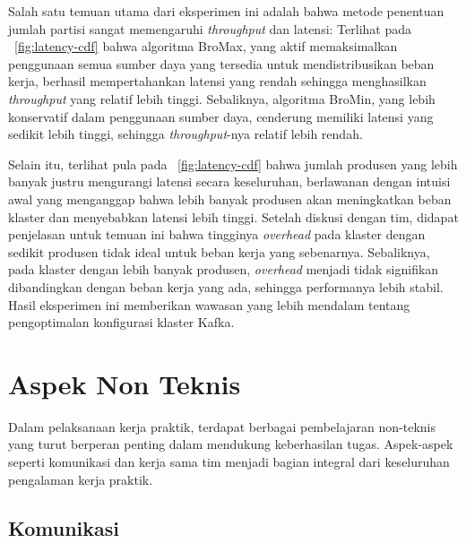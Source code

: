 Salah satu temuan utama dari eksperimen ini adalah bahwa metode penentuan jumlah partisi sangat memengaruhi \textit{throughput} dan latensi: Terlihat pada \pic~\ref{fig:latency-cdf} bahwa algoritma BroMax, yang aktif memaksimalkan penggunaan semua sumber daya yang tersedia untuk mendistribusikan beban kerja, berhasil mempertahankan latensi yang rendah sehingga menghasilkan \textit{throughput} yang relatif lebih tinggi. Sebaliknya, algoritma BroMin, yang lebih konservatif dalam penggunaan sumber daya, cenderung memiliki latensi yang sedikit lebih tinggi, sehingga \textit{throughput}-nya relatif lebih rendah.

Selain itu, terlihat pula pada \pic~\ref{fig:latency-cdf} bahwa jumlah produsen yang lebih banyak justru mengurangi latensi secara keseluruhan, berlawanan dengan intuisi awal yang menganggap bahwa lebih banyak produsen akan meningkatkan beban klaster dan menyebabkan latensi lebih tinggi. Setelah diskusi dengan tim, didapat penjelasan untuk temuan ini bahwa tingginya \textit{overhead} pada klaster dengan sedikit produsen tidak ideal untuk beban kerja yang sebenarnya. Sebaliknya, pada klaster dengan lebih banyak produsen, \textit{overhead} menjadi tidak signifikan dibandingkan dengan beban kerja yang ada, sehingga performanya lebih stabil. Hasil eksperimen ini memberikan wawasan yang lebih mendalam tentang pengoptimalan konfigurasi klaster Kafka.

\section{Aspek Non Teknis}

Dalam pelaksanaan kerja praktik, terdapat berbagai pembelajaran non-teknis yang turut berperan penting dalam mendukung keberhasilan tugas. Aspek-aspek seperti komunikasi dan kerja sama tim menjadi bagian integral dari keseluruhan pengalaman kerja praktik.

\subsection{Komunikasi}

